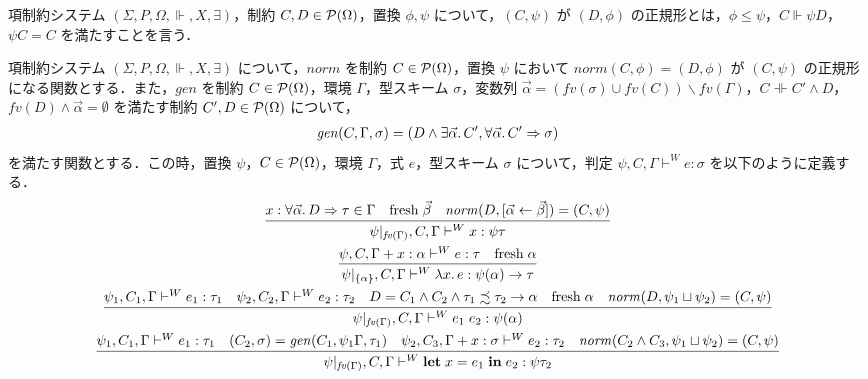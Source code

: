 \begin{definition}[正規形]
  項制約システム $(\Sigma, P, \Omega, \Vdash, X, \exists)$，制約 $C, D \in \mathcal{P}(\Omega)$，置換 $\phi, \psi$ について，$(C, \psi)$ が $(D, \phi)$ の正規形とは，$\phi \leq \psi$，$C \Vdash \psi D$，$\psi C = C$ を満たすことを言う．
\end{definition}

\begin{definition}
  項制約システム $(\Sigma, P, \Omega, \Vdash, X, \exists)$ について，$\mathit{norm}$ を制約 $C \in \mathcal{P}(\Omega)$，置換 $\psi$ において $\mathit{norm}(C, \phi) = (D, \phi)$ が $(C, \psi)$ の正規形になる関数とする．また，$\mathit{gen}$ を制約 $C \in \mathcal{P}(\Omega)$，環境 $\Gamma$，型スキーム $\sigma$，変数列 $\vec{\alpha} = (\mathit{fv}(\sigma) \cup \mathit{fv}(C)) \backslash \mathit{fv}(\Gamma)$，$C \dashVdash C' \land D$，$\mathit{fv}(D) \land \vec{\alpha} = \emptyset$ を満たす制約 $C', D \in \mathcal{P}(\Omega)$ について，
  \begin{align*}
    \mathit{gen}(C, \Gamma, \sigma) = (D \land \exists \vec{\alpha}\ldotp C', \forall \vec{\alpha}\ldotp C' \Rightarrow \sigma)
  \end{align*}
  を満たす関数とする．この時，置換 $\psi$，$C \in \mathcal{P}(\Omega)$，環境 $\Gamma$，式 $e$，型スキーム $\sigma$ について，判定 $\psi, C, \Gamma \vdash^W e: \sigma$ を以下のように定義する．
  \begin{gather*}
    \infer{\psi|_{\mathit{fv}(\Gamma)}, C, \Gamma \vdash^W x: \psi \tau}{
      x: \forall \vec{\alpha}\ldotp D \Rightarrow \tau \in \Gamma
      &
      \mathrm{fresh}\; \vec{\beta}
      &
      \mathit{norm}(D, [\vec{\alpha} \assign \vec{\beta}]) = (C, \psi)
    }
    \\
    \infer{\psi|_{\{\alpha\}}, C, \Gamma \vdash^W \lambda x\ldotp e: \psi(\alpha) \to \tau}{
      \psi, C, \Gamma + x: \alpha \vdash^W e: \tau
      &
      \mathrm{fresh}\; \alpha
    }
    \\
    \infer{\psi|_{\mathit{fv}(\Gamma)}, C, \Gamma \vdash^W e_1\; e_2: \psi(\alpha)}{
      \psi_1, C_1, \Gamma\vdash^W e_1: \tau_1
      &
      \psi_2, C_2, \Gamma\vdash^W e_2: \tau_2
      &
      D = C_1 \land C_2 \land \tau_1 \precsim \tau_2 \to \alpha
      &
      \mathrm{fresh}\; \alpha
      &
      \mathit{norm}(D, \psi_1 \sqcup \psi_2) = (C, \psi)
    }
    \\
    \infer{\psi|_{\mathit{fv}(\Gamma)}, C, \Gamma \vdash^W \mathbf{let}\; x = e_1\; \mathbf{in}\; e_2: \psi\tau_2}{
      \psi_1, C_1, \Gamma\vdash^W e_1: \tau_1
      &
      (C_2, \sigma) = \mathit{gen}(C_1, \psi_1\Gamma, \tau_1)
      &
      \psi_2, C_3, \Gamma + x:\sigma \vdash^W e_2: \tau_2
      &
      \mathit{norm}(C_2 \land C_3, \psi_1 \sqcup \psi_2) = (C, \psi)
    }
  \end{gather*}
\end{definition}

